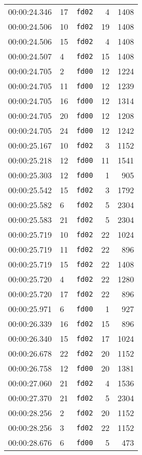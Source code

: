 \documentclass{article}
\begin{document}
\begin{longtable}{lllrr}
00:00:24.346 & 17 & \texttt{fd02} & 4 & 1408 \\
00:00:24.506 & 10 & \texttt{fd02} & 19 & 1408 \\
00:00:24.506 & 15 & \texttt{fd02} & 4 & 1408 \\
00:00:24.507 & 4 & \texttt{fd02} & 15 & 1408 \\
00:00:24.705 & 2 & \texttt{fd00} & 12 & 1224 \\
00:00:24.705 & 11 & \texttt{fd00} & 12 & 1239 \\
00:00:24.705 & 16 & \texttt{fd00} & 12 & 1314 \\
00:00:24.705 & 20 & \texttt{fd00} & 12 & 1208 \\
00:00:24.705 & 24 & \texttt{fd00} & 12 & 1242 \\
00:00:25.167 & 10 & \texttt{fd02} & 3 & 1152 \\
00:00:25.218 & 12 & \texttt{fd00} & 11 & 1541 \\
00:00:25.303 & 12 & \texttt{fd00} & 1 & 905 \\
00:00:25.542 & 15 & \texttt{fd02} & 3 & 1792 \\
00:00:25.582 & 6 & \texttt{fd02} & 5 & 2304 \\
00:00:25.583 & 21 & \texttt{fd02} & 5 & 2304 \\
00:00:25.719 & 10 & \texttt{fd02} & 22 & 1024 \\
00:00:25.719 & 11 & \texttt{fd02} & 22 & 896 \\
00:00:25.719 & 15 & \texttt{fd02} & 22 & 1408 \\
00:00:25.720 & 4 & \texttt{fd02} & 22 & 1280 \\
00:00:25.720 & 17 & \texttt{fd02} & 22 & 896 \\
00:00:25.971 & 6 & \texttt{fd00} & 1 & 927 \\
00:00:26.339 & 16 & \texttt{fd02} & 15 & 896 \\
00:00:26.340 & 15 & \texttt{fd02} & 17 & 1024 \\
00:00:26.678 & 22 & \texttt{fd02} & 20 & 1152 \\
00:00:26.758 & 12 & \texttt{fd00} & 20 & 1381 \\
00:00:27.060 & 21 & \texttt{fd02} & 4 & 1536 \\
00:00:27.370 & 21 & \texttt{fd02} & 5 & 2304 \\
00:00:28.256 & 2 & \texttt{fd02} & 20 & 1152 \\
00:00:28.256 & 3 & \texttt{fd02} & 22 & 1152 \\
00:00:28.676 & 6 & \texttt{fd00} & 5 & 473 \\

\end{longtable}
\end{document}
